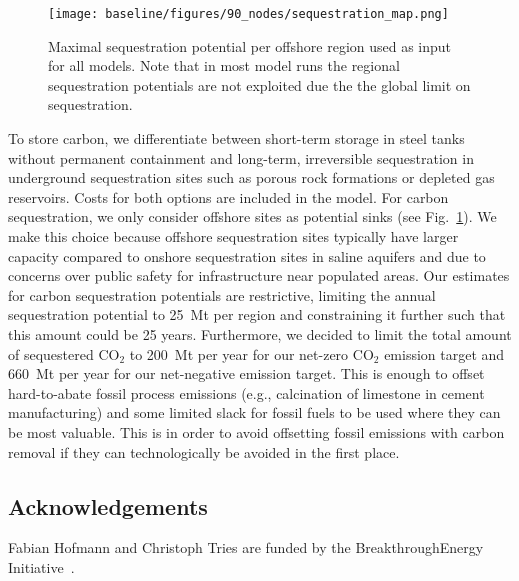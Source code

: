 \documentclass[twocolumn]{article}
\newcommand{\carbon}{CO$_2$}
\begin{document}

\begin{figure}[h!]
    \centering
    \texttt{[image: baseline/figures/90\_nodes/sequestration\_map.png]}
    \caption{Maximal sequestration potential per offshore region used as input for all models. Note that in most model runs the regional sequestration potentials are not exploited due the the global limit on sequestration.}
    \label{fig:sequestration_map}
\end{figure}

To store carbon, we differentiate between short-term storage in steel tanks without permanent containment and long-term, irreversible sequestration in underground sequestration sites such as porous rock formations or depleted gas reservoirs.
Costs for both options are included in the model.
For carbon sequestration, we only consider offshore sites as potential sinks (see Fig.~\ref{fig:sequestration_map}).
We make this choice because offshore sequestration sites typically have larger capacity compared to onshore sequestration sites in saline aquifers and due to concerns over public safety for infrastructure near populated areas.
Our estimates for carbon sequestration potentials are restrictive, limiting the annual sequestration potential to 25~Mt per region and constraining it further such that this amount could be  25 years.
Furthermore, we decided to limit the total amount of sequestered \carbon{} to 200~Mt per year for our net-zero \carbon{} emission target and 660~Mt per year for our net-negative emission target.
This is enough to offset hard-to-abate fossil process emissions (e.g., calcination of limestone in cement manufacturing) and some limited slack for fossil fuels to be used where they can be most valuable.
This is in order to avoid offsetting fossil emissions with carbon removal if they can technologically be avoided in the first place.

\subsection*{Acknowledgements}

Fabian Hofmann and Christoph Tries are funded by the BreakthroughEnergy Initiative~\cite{BreakthroughEnergy2023}.


\printbibliography

\newpage
\appendix
\setcounter{section}{0}
\renewcommand{\thesection}{\Alph{section}}
\renewcommand{\thefigure}{\Alph{section}.\arabic{figure}}
\end{document}
